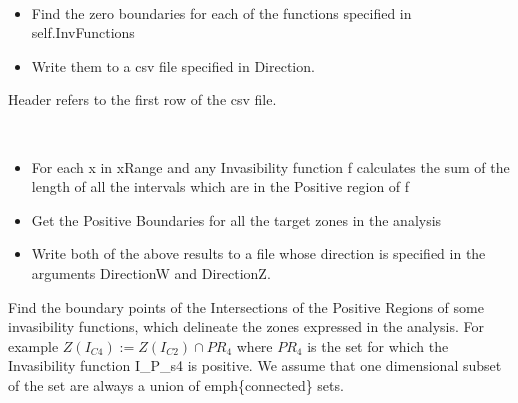 \documentclass[letterpaper,10pt,english]{sphinxmanual}
\begin{document}
\begin{fulllineitems}
\begin{fulllineitems}
\end{fulllineitems}


\begin{fulllineitems}
\label{Analisis/InvasionAnalysis:InvasionAnalysis.InvBoundaries.setAndWriteInvBoundaries}~\begin{itemize}
\item {} 
Find the zero boundaries for each of the functions specified in self.InvFunctions

\item {} 
Write them to a csv file specified in Direction.

\end{itemize}

Header refers to the first row of the csv file.

\end{fulllineitems}


\begin{fulllineitems}
\label{Analisis/InvasionAnalysis:InvasionAnalysis.InvBoundaries.setAndWriteWidthsZones}~\begin{itemize}
\item {} 
For each x in xRange and any Invasibility function f calculates the sum of the length of all the intervals which are in the Positive region of f

\item {} 
Get the Positive Boundaries for all the target zones in the analysis

\item {} 
Write both of the above results to a file whose direction is specified in the arguments DirectionW and DirectionZ.

\end{itemize}

\end{fulllineitems}


\begin{fulllineitems}
\label{Analisis/InvasionAnalysis:InvasionAnalysis.InvBoundaries.setIntersections}
Find the boundary points of the Intersections of the Positive Regions of some invasibility functions, which delineate the zones expressed in the analysis.
For example \(Z(I_{C4}) := Z(I_{C2}) \cap PR_{4}\) where \(PR_{4}\) is the set for which the Invasibility function I\_P\_s4 is positive.
We assume that one dimensional subset of the set are always a union of emph\{connected\} sets.


\end{fulllineitems}
\end{fulllineitems}
\end{document}
